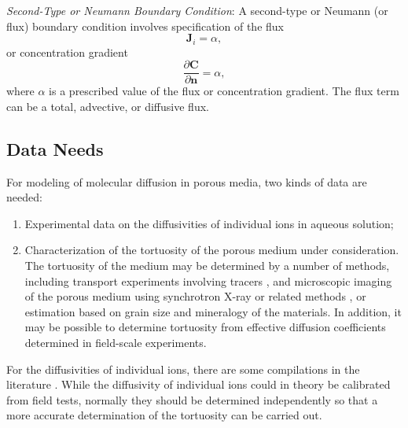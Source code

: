 \textit{Second-Type or Neumann Boundary Condition}:  
A second-type or Neumann (or flux) boundary condition involves specification of the flux
\begin{equation}   \label{eq:Neuman}
  \boldsymbol{J}_{i}=\alpha,
\end{equation}
or concentration gradient
\begin{equation}
  \frac{\partial \boldsymbol{C}}{\partial \boldsymbol{n}} = \alpha,
\end{equation}
where $\alpha$ is a prescribed value of the flux or concentration gradient. The flux term can be a total, advective, or diffusive flux.











\subsection{Data Needs}

\noindent For modeling of molecular diffusion in porous media, two kinds of data are needed:
%
\begin{enumerate}
\item  
  Experimental data on the diffusivities of individual ions in aqueous solution;
\item  
  Characterization of the tortuosity of the porous medium under consideration.  
  The tortuosity of the medium may be determined by a number of methods, 
  including transport experiments involving tracers \citep{navarre2009evolution},
  and microscopic imaging of the porous medium using synchrotron X-ray
  or related methods \citep{navarre2009evolution}, or estimation based on grain size and mineralogy of the materials.  
  In addition, it may be possible to determine tortuosity from effective diffusion coefficients determined in field-scale experiments.
\end{enumerate}

\noindent  
For the diffusivities of individual ions, there are some compilations in the literature \citep{lasaga1998kinetic,steefel2009fluid}.  
While the diffusivity of individual ions could in theory be calibrated from field tests, 
normally they should be determined independently so that a more accurate determination of the tortuosity can be carried out.







